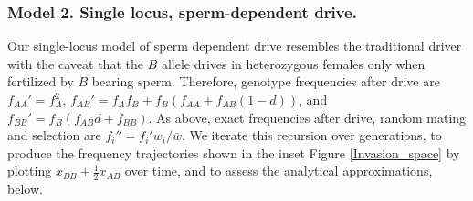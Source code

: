 \documentclass[12pt,letterpaper]{article}
\begin{document}
\subsubsection*{Model 2. Single locus, sperm-dependent drive.}
Our single-locus model of sperm dependent drive resembles the traditional driver with the caveat that the $B$ allele drives in heterozygous females only when fertilized by $B$ bearing sperm. 
Therefore, genotype frequencies after drive are 
	$f_{AA}'=f_A^2$, 
	$f_{AB}'=f_A f_B+f_B (f_{AA} + f_{AB}(1 - d)) $,
	and $f_{BB}'= f_B (f_{AB} d + f_{BB} )$. 
As above, exact frequencies after drive, random mating and selection are $f_i''= f_i'w_i/\bar{w}$. 
We iterate this recursion over generations, to produce the frequency trajectories shown in the inset
Figure \ref{Invasion_space} by plotting $x_{BB}+ \frac{1}{2}x_{AB}$
over time, and to assess the analytical approximations, below.
\end{document}
